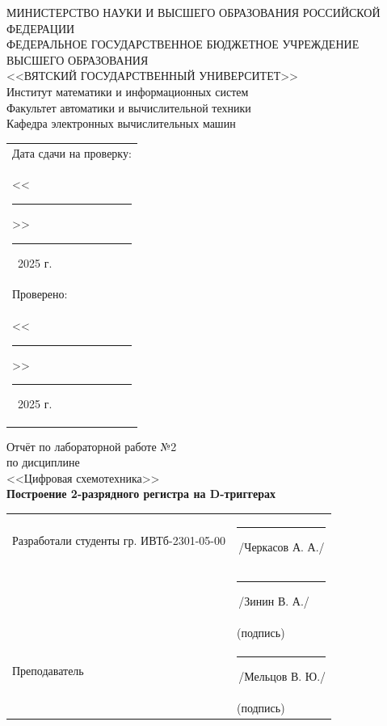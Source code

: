 \documentclass[oneside,a4paper,14pt]{extarticle}
\begin{document}
\newpage
\thispagestyle{empty}
\begin{center}
  МИНИСТЕРСТВО НАУКИ И ВЫСШЕГО ОБРАЗОВАНИЯ РОССИЙСКОЙ ФЕДЕРАЦИИ\\
  ФЕДЕРАЛЬНОЕ ГОСУДАРСТВЕННОЕ БЮДЖЕТНОЕ УЧРЕЖДЕНИЕ ВЫСШЕГО ОБРАЗОВАНИЯ\\
  <<ВЯТСКИЙ ГОСУДАРСТВЕННЫЙ УНИВЕРСИТЕТ>>\\
  Институт математики и информационных систем\\
  Факультет автоматики и вычислительной техники\\
  Кафедра электронных вычислительных машин
\end{center}
\vspace{10mm}

\hfill
\begin{tabular}{l}
  \footnotesize Дата сдачи на проверку:                                          \\
  \footnotesize <<\rule[-1mm]{5mm}{0.10mm}\/>>\rule[-1mm]{20mm}{0.10mm}\ 2025 г. \\
  \footnotesize Проверено:                                                       \\
  \footnotesize <<\rule[-1mm]{5mm}{0.10mm}\/>>\rule[-1mm]{20mm}{0.10mm}\ 2025 г. \\
\end{tabular}
\vfill

\begin{center}
  Отчёт по лабораторной работе №2\\
  по дисциплине\\
  <<Цифровая схемотехника>>\\
  \textbf{Построение 2-разрядного регистра на D-триггерах}\\
\end{center}
\vspace{25mm}
\noindent
\begin{tabular}{ll}
  Разработали студенты гр. ИВТб-2301-05-00 & \hspace{5mm}\rule[-1mm]{30mm}{0.10mm}\,/Черкасов А. А./ \\
                                           & \hspace{5mm}\rule[-1mm]{30mm}{0.10mm}\,/Зинин В. А./    \\
                                           & \hspace{12.5mm}\footnotesize(подпись)                   \\
  Преподаватель                            & \hspace{5mm}\rule[-1mm]{30mm}{0.10mm}\,/Мельцов В. Ю./  \\
                                           & \hspace{12.5mm}\footnotesize(подпись)                   \\
\end{tabular}
\end{document}
